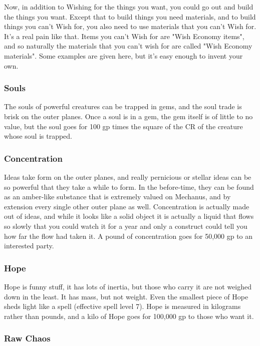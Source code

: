Now, in addition to Wishing for the things you want, you could go out and build the things you want. Except that to build things you need materials, and to build things you can't Wish for, you also need to use materials that you can't Wish for. It's a real pain like that. Items you can't Wish for are "Wish Economy items", and so naturally the materials that you can't wish for are called "Wish Economy materials". Some examples are given here, but it's easy enough to invent your own.

\subsubsection{Souls}

The souls of powerful creatures can be trapped in gems, and the soul trade is brisk on the outer planes. Once a soul is in a gem, the gem itself is of little to no value, but the soul goes for 100 gp times the square of the CR of the creature whose soul is trapped.

\subsubsection{Concentration}

Ideas take form on the outer planes, and really pernicious or stellar ideas can be so powerful that they take a while to form. In the before-time, they can be found as an amber-like substance that is extremely valued on Mechanus, and by extension every single other outer plane as well. Concentration is actually made out of ideas, and while it looks like a solid object it is actually a liquid that flows so slowly that you could watch it for a year and only a construct could tell you how far the flow had taken it. A pound of concentration goes for 50,000 gp to an interested party.

\subsubsection{Hope}

Hope is funny stuff, it has lots of inertia, but those who carry it are not weighed down in the least. It has mass, but not weight. Even the smallest piece of Hope sheds light like a  spell (effective spell level 7). Hope is measured in kilograms rather than pounds, and a kilo of Hope goes for 100,000 gp to those who want it.

\subsubsection{Raw Chaos}

